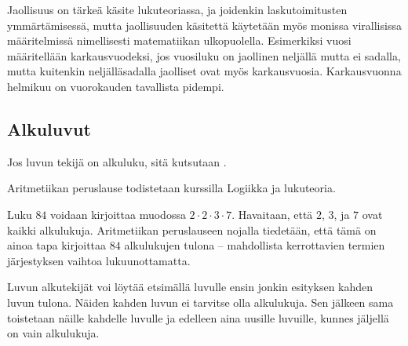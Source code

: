 Jaollisuus on tärkeä käsite lukuteoriassa, ja joidenkin laskutoimitusten ymmärtämisessä, mutta jaollisuuden käsitettä käytetään myös monissa virallisissa määritelmissä nimellisesti matematiikan ulkopuolella. Esimerkiksi vuosi määritellään karkausvuodeksi, jos vuosiluku on jaollinen neljällä mutta ei sadalla, mutta kuitenkin neljälläsadalla jaolliset ovat myös karkausvuosia. Karkausvuonna helmikuu on vuorokauden tavallista pidempi.


\subsection{Alkuluvut}


\begin{esimerkki}
\end{esimerkki}

Jos luvun tekijä on alkuluku, sitä kutsutaan .

% 	


Aritmetiikan peruslause todistetaan kurssilla Logiikka ja lukuteoria. %

\newpage %
\begin{esimerkki}
Luku $84$ voidaan kirjoittaa muodossa $2\cdot 2\cdot 3\cdot 7$. Havaitaan, että $2$, $3$, ja $7$ ovat kaikki alkulukuja. Aritmetiikan peruslauseen nojalla tiedetään, että tämä on ainoa tapa kirjoittaa $84$ alkulukujen tulona -- mahdollista kerrottavien termien järjestyksen vaihtoa lukuunottamatta.
\end{esimerkki}

Luvun alkutekijät voi löytää etsimällä luvulle ensin jonkin esityksen kahden luvun tulona. Näiden kahden luvun ei tarvitse olla alkulukuja. Sen jälkeen sama toistetaan näille kahdelle luvulle ja edelleen aina uusille luvuille, kunnes jäljellä on vain alkulukuja.

% 	
